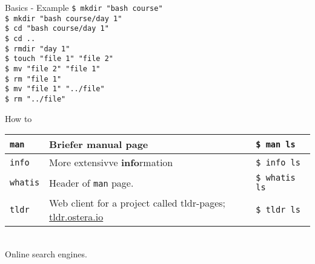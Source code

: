\documentclass{beamer}
\let\tt\texttt
\let\bf\textbf
\begin{document}
\begin{frame}{Basics - Example}
        \tt{\$ mkdir "bash course"}         \\
        \tt{\$ mkdir "bash course/day 1"}   \\
        \tt{\$ cd "bash course/day 1"}      \\
        \tt{\$ cd ..}                       \\
        \tt{\$ rmdir "day 1"}               \\
        \tt{\$ touch "file 1" "file 2"}     \\
        \tt{\$ mv "file 2" "file 1"}        \\
        \tt{\$ rm "file 1"}                 \\
        \tt{\$ mv "file 1" "../file"}       \\
        \tt{\$ rm "../file"}                \\
\end{frame}

\begin{frame}{How to}
        \begin{tabular}{p{} p{} p{}}
                \hline
                \tt{man}                    &
                Briefer \bf{man}ual page    &
                \tt{\$ man ls}              \\
                \hline
                \tt{info}                           &
                More extensivve \bf{info}rmation    &
                \tt{\$ info ls}                     \\
                \hline
                \tt{whatis}                         &
                Header of \tt{man} page.            &
                \tt{\$ whatis ls}                   \\
                \hline
                \tt{tldr}             &
                Web client for a project called tldr-pages; 
                \url{tldr.ostera.io} &
                \tt{\$ tldr ls}       \\
                \hline
        \end{tabular}   \\
        Online search engines.
\end{frame}
\end{document}
